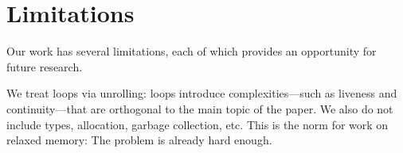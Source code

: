 



\section{Limitations}
\label{sec:limits}


 Our work has several limitations, each of which provides an opportunity for
future research.  %

We treat loops via unrolling: loops introduce
complexities\allowbreak{}---such as liveness and continuity---that are
orthogonal to the main topic of the paper. We also do not include types,
allocation, garbage collection, etc.  This is the norm for work on relaxed
memory: The problem is already hard enough. %

